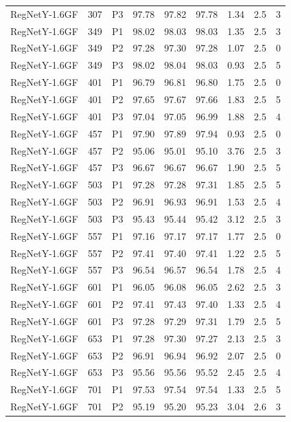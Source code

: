 {\begin{longtable}{lrlrrrrrr}
RegNetY-1.6GF & 307 & P3 & 97.78 & 97.82 & 97.78 & 1.34 & 2.5 & 3 \\
RegNetY-1.6GF & 349 & P1 & 98.02 & 98.03 & 98.03 & 1.35 & 2.5 & 3 \\
RegNetY-1.6GF & 349 & P2 & 97.28 & 97.30 & 97.28 & 1.07 & 2.5 & 0 \\
RegNetY-1.6GF & 349 & P3 & 98.02 & 98.04 & 98.03 & 0.93 & 2.5 & 5 \\
RegNetY-1.6GF & 401 & P1 & 96.79 & 96.81 & 96.80 & 1.75 & 2.5 & 0 \\
RegNetY-1.6GF & 401 & P2 & 97.65 & 97.67 & 97.66 & 1.83 & 2.5 & 5 \\
RegNetY-1.6GF & 401 & P3 & 97.04 & 97.05 & 96.99 & 1.88 & 2.5 & 4 \\
RegNetY-1.6GF & 457 & P1 & 97.90 & 97.89 & 97.94 & 0.93 & 2.5 & 0 \\
RegNetY-1.6GF & 457 & P2 & 95.06 & 95.01 & 95.10 & 3.76 & 2.5 & 3 \\
RegNetY-1.6GF & 457 & P3 & 96.67 & 96.67 & 96.67 & 1.90 & 2.5 & 5 \\
RegNetY-1.6GF & 503 & P1 & 97.28 & 97.28 & 97.31 & 1.85 & 2.5 & 5 \\
RegNetY-1.6GF & 503 & P2 & 96.91 & 96.93 & 96.91 & 1.53 & 2.5 & 4 \\
RegNetY-1.6GF & 503 & P3 & 95.43 & 95.44 & 95.42 & 3.12 & 2.5 & 3 \\
RegNetY-1.6GF & 557 & P1 & 97.16 & 97.17 & 97.17 & 1.77 & 2.5 & 0 \\
RegNetY-1.6GF & 557 & P2 & 97.41 & 97.40 & 97.41 & 1.22 & 2.5 & 5 \\
RegNetY-1.6GF & 557 & P3 & 96.54 & 96.57 & 96.54 & 1.78 & 2.5 & 4 \\
RegNetY-1.6GF & 601 & P1 & 96.05 & 96.08 & 96.05 & 2.62 & 2.5 & 3 \\
RegNetY-1.6GF & 601 & P2 & 97.41 & 97.43 & 97.40 & 1.33 & 2.5 & 4 \\
RegNetY-1.6GF & 601 & P3 & 97.28 & 97.29 & 97.31 & 1.79 & 2.5 & 5 \\
RegNetY-1.6GF & 653 & P1 & 97.28 & 97.30 & 97.27 & 2.13 & 2.5 & 3 \\
RegNetY-1.6GF & 653 & P2 & 96.91 & 96.94 & 96.92 & 2.07 & 2.5 & 0 \\
RegNetY-1.6GF & 653 & P3 & 95.56 & 95.56 & 95.52 & 2.45 & 2.5 & 4 \\
RegNetY-1.6GF & 701 & P1 & 97.53 & 97.54 & 97.54 & 1.33 & 2.5 & 5 \\
RegNetY-1.6GF & 701 & P2 & 95.19 & 95.20 & 95.23 & 3.04 & 2.6 & 3 \\

\end{longtable}}
